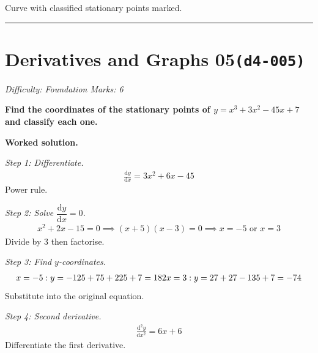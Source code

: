\documentclass[11pt]{article}
\newcommand{\question}[1]{\par\medskip\noindent\textbf{#1}\par}
\begin{document}
\begin{center}
{
}
\end{center}
\small Curve with classified stationary points marked.\normalsize

\medskip\hrule

\section*{Derivatives and Graphs 05\quad\small\texttt{(d4-005)}}
\textit{Difficulty: Foundation \quad\textbar\quad Marks: 6}

\question{Find the coordinates of the stationary points of \( y = x^3 + 3x^2 - 45x + 7 \) and classify each one.}

\textbf{Worked solution.}

\textit{Step 1: Differentiate.}
\[\begin{gathered}
\frac{\mathrm{d}y}{\mathrm{d}x} = 3x^2 + 6x - 45
\end{gathered}\]
Power rule.

\textit{Step 2: Solve \( \dfrac{\mathrm{d}y}{\mathrm{d}x} = 0 \).}
\[\begin{gathered}
x^2 + 2x - 15 = 0 \implies (x + 5)(x - 3) = 0 \implies x = -5 \text{ or } x = 3
\end{gathered}\]
Divide by 3 then factorise.

\textit{Step 3: Find \( y \)-coordinates.}
\[\begin{gathered}
x=-5: y = -125 + 75 + 225 + 7 = 182 \newline x=3: y = 27 + 27 - 135 + 7 = -74
\end{gathered}\]
Substitute into the original equation.

\textit{Step 4: Second derivative.}
\[\begin{gathered}
\frac{\mathrm{d}^2y}{\mathrm{d}x^2} = 6x + 6
\end{gathered}\]
Differentiate the first derivative.
\end{document}
